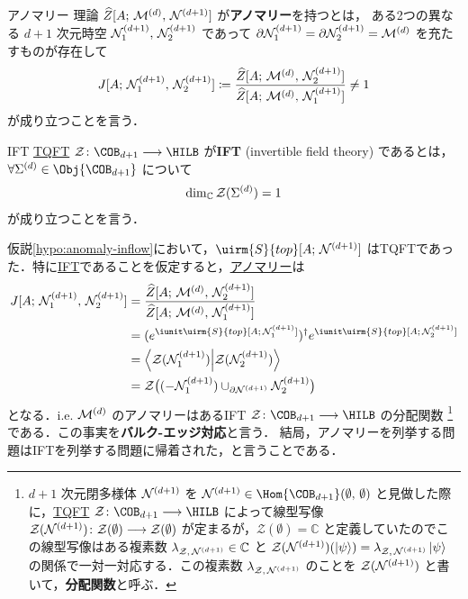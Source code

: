 \documentclass[TQFT_main]{subfiles}
\begin{document}
\begin{mydef}[label=def:anomaly-formal]{アノマリー}
    理論 $\widehat{Z}[A;\, \mathcal{M}^{(d)},\, \mathcal{N}^{(d+1)}]$ が\textbf{アノマリー}を持つとは，
    ある2つの異なる $d+1$ 次元時空 $\mathcal{N}^{(d+1)}_1,\, \mathcal{N}^{(d+1)}_2$ であって $\partial \mathcal{N}^{(d+1)}_1 = \partial \mathcal{N}^{(d+1)}_2 = \mathcal{M}^{(d)}$ を充たすものが存在して
    \begin{align}
        J [A;\, \mathcal{N}^{(d+1)}_1,\, \mathcal{N}^{(d+1)}_2] \coloneqq \frac{\widehat{Z}[A;\, \mathcal{M}^{(d)},\, \mathcal{N}^{(d+1)}_2]}{\widehat{Z}[A;\, \mathcal{M}^{(d)},\, \mathcal{N}^{(d+1)}_1]} \neq 1
    \end{align}
    が成り立つことを言う．
\end{mydef}

\begin{mydef}[label=def:IFT]{IFT}
    \hyperref[def:TQFT]{TQFT} $\mathcal{Z} \colon \COB_{d+1} \lto \HILB$ が\textbf{IFT} (invertible field theory) であるとは，$\forall \mfd{\Sigma}{d} \in \Obj{\COB_{d+1}}$ について
    \begin{align}
        \dim_{\mathbb{C}} \mathcal{Z}(\Sigma^{(d)}) = 1
    \end{align}
    が成り立つことを言う．
\end{mydef}

仮説\ref{hypo:anomaly-inflow}において，$\uirm{S}{top}[A;\, \mfdcal{N}{d+1}]$ はTQFTであった．特に\hyperref[def:IFT]{IFT}であることを仮定すると，\hyperref[def:anomaly-formal]{アノマリー}は
\begin{align}
    J [A;\, \mfdcal{N}{d+1}_1,\, \mfdcal{N}{d+1}_2] 
    &= \frac{\widehat{Z}[A;\, \mfdcal{M}{d},\, \mfdcal{N}{d+1}_2]}{\widehat{Z}[A;\, \mfdcal{M}{d},\, \mfdcal{N}{d+1}_1]} \\
    &= (e^{\iunit \uirm{S}{top}[A;\, \mfdcal{N}{d+1}_1]})^\dagger e^{\iunit \uirm{S}{top}[A;\, \mfdcal{N}{d+1}_2]} \\
    &= \braket{\mathcal{Z}(\mfdcal{N}{d+1}_1)}{\mathcal{Z}(\mfdcal{N}{d+1}_2)} \\
    &= \mathcal{Z} \bigl( (-\mfdcal{N}{d+1}_1) \cup_{\partial \mfdcal{N}{d+1}} \mfdcal{N}{d+1}_2 \bigr) 
\end{align}
となる．i.e. $\mathcal{M}^{(d)}$ のアノマリーはあるIFT $\mathcal{Z} \colon \COB_{d+1} \lto \HILB$ の分配関数
\footnote{$d+1$ 次元閉多様体 $\mathcal{N}^{(d+1)}$ を $\mfdcal{N}{d+1} \in \Hom{\COB_{d+1}}(\emptyset,\, \emptyset)$ と見做した際に，\hyperref[def:TQFT]{TQFT} $\mathcal{Z} \colon \COB_{d+1} \lto \HILB$ によって線型写像 $\mathcal{Z}(\mathcal{N}^{(d+1)}) \colon \mathcal{Z}(\emptyset) \longrightarrow \mathcal{Z}(\emptyset)$ が定まるが，$\mathcal{Z}(\emptyset) = \mathbb{C}$ と定義していたのでこの線型写像はある複素数 $\lambda_{\mathcal{Z},\, \mathcal{N}^{(d+1)}} \in \mathbb{C}$ と $\mathcal{Z}(\mathcal{N}^{(d+1)})(\ket{\psi}) = \lambda_{\mathcal{Z},\, \mathcal{N}^{(d+1)}} \ket{\psi}$ の関係で一対一対応する．この複素数 $\lambda_{\mathcal{Z},\, \mathcal{N}^{(d+1)}}$ のことを $\mathcal{Z}(\mathcal{N}^{(d+1)})$ と書いて，\textbf{分配関数}と呼ぶ．}
である．この事実を\textbf{バルク-エッジ対応}と言う．
結局，アノマリーを列挙する問題はIFTを列挙する問題に帰着された，と言うことである．
\end{document}
